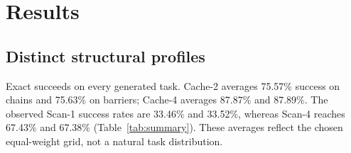 \documentclass[sigconf,nonacm]{acmart}
\begin{document}
\section{Results}
\subsection{Distinct structural profiles}
Exact succeeds on every generated task. Cache-2 averages 75.57\% success
on chains and 75.63\% on barriers; Cache-4 averages 87.87\% and 87.89\%.
The observed Scan-1 success rates are 33.46\% and 33.52\%, whereas Scan-4
reaches 67.43\% and 67.38\% (Table~\ref{tab:summary}).
These averages reflect the chosen equal-weight grid, not a natural task
distribution.

\begin{table}[t]
\centering
\small

\caption{Measured and instance-conditional predicted success. Intervals are
paired seed-bootstrap bands. Degenerate bootstrap bands do not bound
unseen rare events; Table~\ref{tab:scheduler} provides nondegenerate
binomial intervals for the sparse scheduling condition.}
\label{tab:summary}
\end{table}
\end{document}
